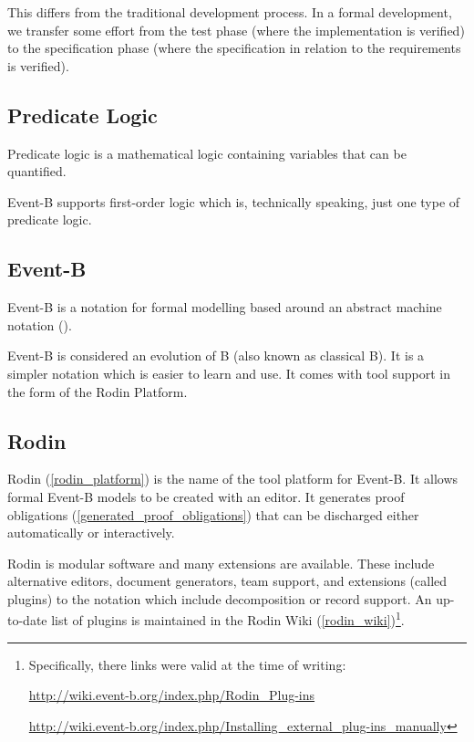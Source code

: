 This differs from the traditional development process. In a formal development, we transfer some effort from the test phase (where the implementation is verified) to the specification phase (where the specification in relation to the requirements is verified).

\subsection{Predicate Logic}
\label{tut_predicate_logic}

Predicate logic is a mathematical logic containing variables that can be quantified.

Event-B supports first-order logic which is, technically speaking, just one type of predicate logic.  

\subsection{Event-B}
\label{tut_eventb}

Event-B is a notation for formal modelling based around an abstract machine notation ().

Event-B is considered an evolution of B (also known as classical B). It is a simpler notation which is easier to learn and use. It comes with tool support in the form of the Rodin Platform.

\subsection{Rodin}
\label{tut_rodin}

Rodin (\ref{rodin_platform}) is the name of the tool platform for Event-B.  It allows formal Event-B models to be created with an editor.  It generates proof obligations (\ref{generated_proof_obligations}) that can be discharged either automatically or interactively.

Rodin is modular software and many extensions are available.  These include alternative editors, document generators, team support, and extensions (called plugins) to the notation which include decomposition or record support.  An up-to-date list of plugins is maintained in the Rodin Wiki (\ref{rodin_wiki})\footnote{Specifically, there links were valid at the time of writing:

\url{http://wiki.event-b.org/index.php/Rodin_Plug-ins}

\url{http://wiki.event-b.org/index.php/Installing_external_plug-ins_manually}}.

